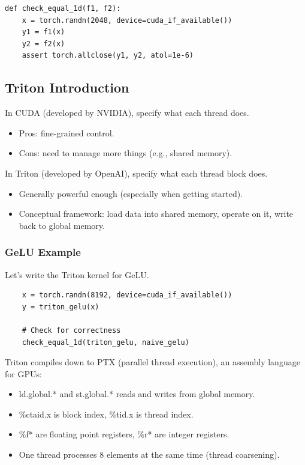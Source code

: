 \documentclass[12pt,twoside]{article}
\begin{document}
\begin{verbatim}
def check_equal_1d(f1, f2):
    x = torch.randn(2048, device=cuda_if_available())
    y1 = f1(x)  
    y2 = f2(x)  
    assert torch.allclose(y1, y2, atol=1e-6)
\end{verbatim}

\subsection*{Triton Introduction}

In CUDA (developed by NVIDIA), specify what each thread does.

\begin{itemize}
    \item Pros: fine-grained control.
    \item Cons: need to manage more things (e.g., shared memory).
\end{itemize}

In Triton (developed by OpenAI), specify what each thread block does.

\begin{itemize}
    \item Generally powerful enough (especially when getting started).
    \item Conceptual framework: load data into shared memory, operate on it, write back to global memory.
\end{itemize}

\subsubsection*{GeLU Example}

Let's write the Triton kernel for GeLU.

\begin{verbatim}
    x = torch.randn(8192, device=cuda_if_available())
    y = triton_gelu(x)
    
    # Check for correctness 
    check_equal_1d(triton_gelu, naive_gelu)
\end{verbatim}

Triton compiles down to PTX (parallel thread execution), an assembly language for GPUs:

\begin{itemize}
    \item ld.global.* and st.global.* reads and writes from global memory.
    \item \%ctaid.x is block index, \%tid.x is thread index.
    \item \%f* are floating point registers, \%r* are integer registers.
    \item One thread processes 8 elements at the same time (thread coarsening).
\end{itemize}
\end{document}
